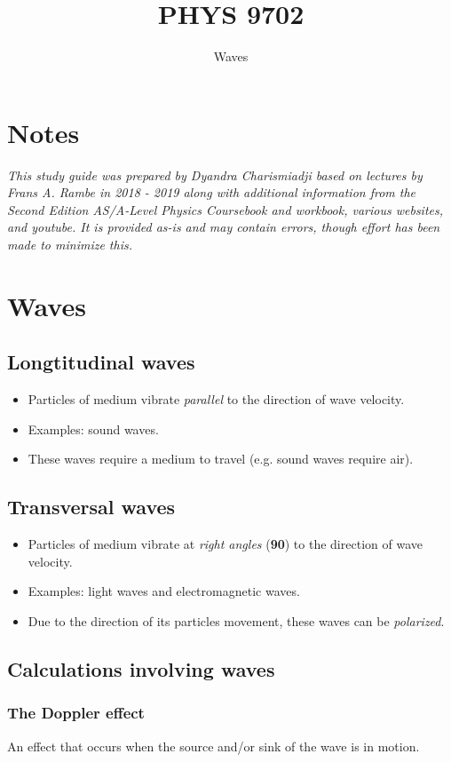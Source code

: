 \documentclass[12pt,a4paper]{article}
\begin{document}
\title{\textbf {PHYS 9702}}
\date{Waves}
\maketitle
\tableofcontents{}
\section*{Notes}
\textit{This study guide was prepared by Dyandra Charismiadji based on lectures by Frans A. Rambe in 2018 - 2019 along with additional information from the Second Edition AS/A-Level Physics Coursebook and workbook, various websites, and youtube. It is provided as-is and may contain errors, though effort has been made to minimize this. }

\newpage
\section{Waves}
\subsection{Longtitudinal waves}
\begin{itemize}
    \item Particles of medium vibrate \textit{parallel} to the direction of wave velocity.
    \item Examples: sound waves.
    \item These waves require a medium to travel (e.g. sound waves require air).
\end{itemize}
\subsection{Transversal waves}
\begin{itemize}
    \item Particles of medium vibrate at \textit{right angles} (\textbf{90}\textdegree) to the direction of wave velocity.
    \item Examples: light waves and electromagnetic waves.
    \item Due to the direction of its particles movement, these waves can be \textit{polarized}.
\end{itemize}
\subsection{Calculations involving waves}

\subsubsection{The Doppler effect}
An effect that occurs when the source and/or sink of the wave is in motion.
\end{document}

